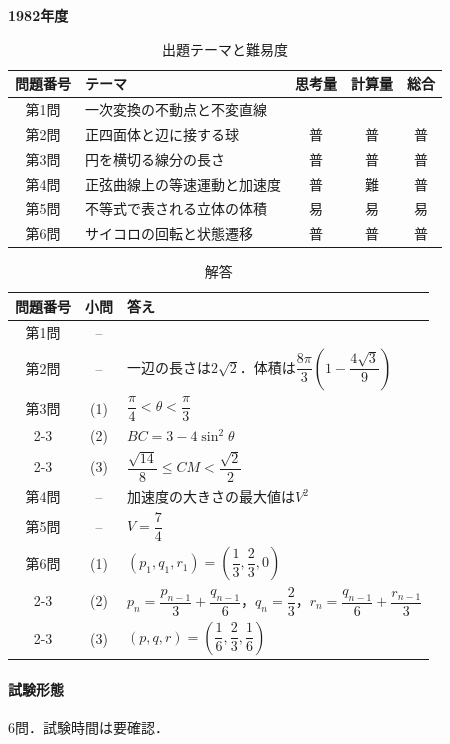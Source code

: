 \documentclass[../../main.tex]{subfiles}
\begin{document}
\begin{center}
  {\fontsize{48pt}{58pt}\selectfont \textbf{1982}\normalsize\textbf{年度}}
\end{center}

\begin{table}[htb]
  \centering
  \caption{出題テーマと難易度}
  \begin{tabular}{|c|p{6.2cm}|c|c|c|}
    \hline
    \textbf{問題番号} & \textbf{テーマ} & \textbf{思考量} & \textbf{計算量} & \textbf{総合} \\
    \hline
    第1問 & 一次変換の不動点と不変直線 &  &  &  \\
    \hline
    第2問 & 正四面体と辺に接する球 & 普 & 普 & 普 \\
    \hline
    第3問 & 円を横切る線分の長さ & 普 & 普 & 普 \\
    \hline
    第4問 & 正弦曲線上の等速運動と加速度 & 普 & 難 & 普 \\
    \hline
    第5問 & 不等式で表される立体の体積 & 易 & 易 & 易 \\
    \hline
    第6問 & サイコロの回転と状態遷移 & 普 & 普 & 普 \\
    \hline
  \end{tabular}
\end{table}

\begin{table}[htb]
  \centering
  \caption{解答}
  \renewcommand{\arraystretch}{1.4}
  \begin{tabular}{|c|c|p{9cm}|}
    \hline
    \textbf{問題番号} & \textbf{小問} & \textbf{答え} \\
    \hline
    第1問 & -- & \\
    \hline
    第2問 & -- & 一辺の長さは$2\sqrt{2}$．体積は$\dfrac{8\pi}{3}\left(1-\dfrac{4\sqrt{3}}{9}\right)$ \\
    \hline
    第3問 & (1) & $\dfrac{\pi}{4}<\theta<\dfrac{\pi}{3}$ \\
    \cline{2-3}
    & (2) & $BC=3-4\sin^2\theta$ \\
    \cline{2-3}
    & (3) & $\dfrac{\sqrt{14}}{8}\le CM<\dfrac{\sqrt{2}}{2}$ \\
    \hline
    第4問 & -- & 加速度の大きさの最大値は$V^2$ \\
    \hline
    第5問 & -- & $V=\dfrac{7}{4}$ \\
    \hline
    第6問 & (1) & $(p_1,q_1,r_1)=\left(\dfrac{1}{3},\dfrac{2}{3},0\right)$ \\
    \cline{2-3}
    & (2) & $p_n=\dfrac{p_{n-1}}{3}+\dfrac{q_{n-1}}{6}$，$q_n=\dfrac{2}{3}$，$r_n=\dfrac{q_{n-1}}{6}+\dfrac{r_{n-1}}{3}$ \\
    \cline{2-3}
    & (3) & $(p,q,r)=\left(\dfrac{1}{6},\dfrac{2}{3},\dfrac{1}{6}\right)$ \\
    \hline
  \end{tabular}
\end{table}

\paragraph{試験形態}
6問．試験時間は要確認．
\end{document}

